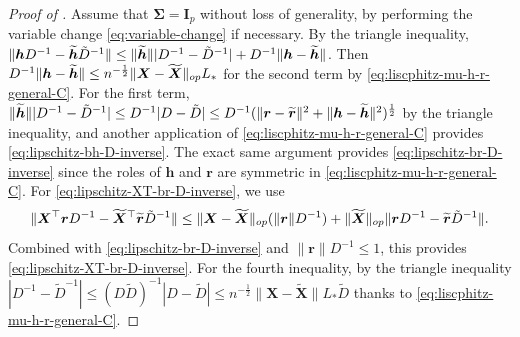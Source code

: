 \documentclass[11pt]{amsart}
\numberwithin{equation}{section}
\numberwithin{equation}{section}
\def\mathbold{\boldsymbol} %
\def\bh{\mathbold{h}}\def\hhat{\widehat{h}}\def\htil{\widetilde{h}}
\def\bI{\mathbold{I}}\def\hbI{{\widehat{\bI}}}\def\tbI{{\widetilde{\bI}}}
\def\br{\mathbold{r}}\def\rhat{\widehat{r}}\def\rtil{\widetilde{r}}\def\rbar{{\overline r}}\def\brbar{{\overline \br}}
\def\bX{\mathbold{X}}\def\hbX{{\widehat{\bX}}}\def\tbX{{\widetilde{\bX}}}\def\bXbar{{\overline \bX}}
\def\bSigma{\mathbold{\Sigma}}\def\hbSigma{{\widehat{\bSigma}}}
\begin{document}
\begin{proof}[Proof of ]
    Assume that $\bSigma=\bI_p$ without loss of generality,
    by performing the variable change \eqref{eq:variable-change}
    if necessary.
    By the triangle inequality,
$\|\bh D^{-1} - \tbh \tilde D^{-1}\|
\le \|\tbh\| |D^{-1} - \tilde D^{-1}| + D^{-1} \|\bh-\tbh\|$.
Then $D^{-1} \|\bh-\tbh\| \le n^{-\frac12}\|\bX-\tbX\|_{op}L_*$
for the second term by \eqref{eq:liscphitz-mu-h-r-general-C}.
For the first term, $\|\tbh\| |D^{-1} - \tilde D^{-1}|\le D^{-1}|D - \tilde D|
\le D^{-1}(\|\br-\tbr\|^2 + \|\bh-\tbh\|^2)^{\frac12}$
by the triangle inequality, and another application of \eqref{eq:liscphitz-mu-h-r-general-C}
provides \eqref{eq:lipschitz-bh-D-inverse}.
The exact same argument provides \eqref{eq:lipschitz-br-D-inverse}
since the roles of $\bh$ and $\br$ are symmetric in \eqref{eq:liscphitz-mu-h-r-general-C}.
For \eqref{eq:lipschitz-XT-br-D-inverse}, we use
$$\|\bX^\top \br D^{-1} -  \tbX{}^\top \tbr \tilde D^{-1}\|
\le \|\bX-\tbX\|_{op} (\|\br\|D^{-1})
+ \|\tbX\|_{op} \|\br D^{-1} - \tbr \tilde D^{-1}\|.$$
Combined with \eqref{eq:lipschitz-br-D-inverse} and $\|\br\|D^{-1} \le 1$, this provides
\eqref{eq:lipschitz-XT-br-D-inverse}.
For the fourth inequality,
by the triangle inequality
$
    |D^{-1} - \tilde D^{-1}|
    \le
    (D\tilde D)^{-1}
    |D-\tilde D|
    \le n^{-\frac12}\|\bX-\tbX\|
    L_* \tilde D
    $ thanks to \eqref{eq:liscphitz-mu-h-r-general-C}.
\end{proof}
\end{document}
